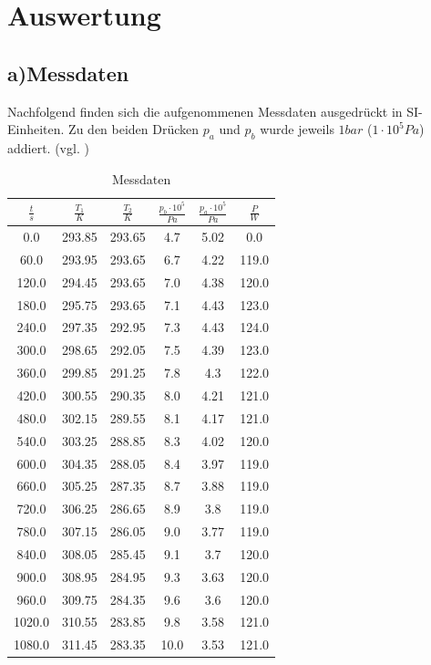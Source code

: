 \section{Auswertung}
\label{sec:Auswertung}
\subsection{a)Messdaten}
\label{sec:messdaten}
Nachfolgend finden sich die aufgenommenen Messdaten ausgedrückt in SI-Einheiten. Zu den beiden Drücken $p_a$ und $p_b$ wurde jeweils $1 bar$ ($1\cdot10^5 Pa$) addiert. (vgl. \cite{Anleitung})
\begin{table}
  \centering
  \caption{Messdaten}

  \label{tab:Messdaten}
\begin{tabular}{cccccc}
\toprule
$\frac{t}{s}$ & $\frac{T_1}{K}$ & $\frac{T_2}{K}$& $\frac{p_b\cdot10^5}{Pa}$ & $\frac{p_a\cdot10^5}{Pa}$ & $\frac{P}{W}$ \\
\midrule
0.0 & 293.85 & 293.65 & 4.7 & 5.02 & 0.0 \\
60.0 & 293.95 & 293.65 & 6.7 & 4.22 & 119.0 \\
120.0 & 294.45 & 293.65 & 7.0 & 4.38 & 120.0 \\
180.0 & 295.75 & 293.65 & 7.1 & 4.43 & 123.0 \\
240.0 & 297.35 & 292.95 & 7.3 & 4.43 & 124.0 \\
300.0 & 298.65 & 292.05 & 7.5 & 4.39 & 123.0 \\
360.0 & 299.85 & 291.25 & 7.8 & 4.3 & 122.0 \\
420.0 & 300.55 & 290.35 & 8.0 & 4.21 & 121.0 \\
480.0 & 302.15 & 289.55 & 8.1 & 4.17 & 121.0 \\
540.0 & 303.25 & 288.85 & 8.3 & 4.02 & 120.0 \\
600.0 & 304.35 & 288.05 & 8.4 & 3.97 & 119.0 \\
660.0 & 305.25 & 287.35 & 8.7 & 3.88 & 119.0 \\
720.0 & 306.25 & 286.65 & 8.9 & 3.8 & 119.0 \\
780.0 & 307.15 & 286.05 & 9.0 & 3.77 & 119.0 \\
840.0 & 308.05 & 285.45 & 9.1 & 3.7 & 120.0 \\
900.0 & 308.95 & 284.95 & 9.3 & 3.63 & 120.0 \\
960.0 & 309.75 & 284.35 & 9.6 & 3.6 & 120.0 \\
1020.0 & 310.55 & 283.85 & 9.8 & 3.58 & 121.0 \\
1080.0 & 311.45 & 283.35 & 10.0 & 3.53 & 121.0 \\

\end{tabular}
\end{table}
